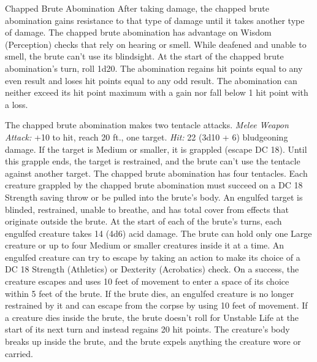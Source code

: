 \documentclass[10pt,a4paper,twoside,twocolumn,openany,bg=print,nodeprecatedcode]{dndbook}
\begin{document}
\begin{DndMonster}[float*=t]{Chapped Brute Abomination}
\DndMonsterBasics[
armor-class = {16 (natural armor)},
hit-points = {\DndDice{14d12 + 70}},
speed = {40 ft.}
]
\DndMonsterAbilityScores[
 str = 23,
 dex = 10,
 con = 20,
 int = 3,
 wis = 10,
 cha = 5
]
\DndMonsterDetails[
skills = {Athletics +10},
damage-resistances = {necrotic},
senses = {blindsight 90 ft. (blind beyond this radius), passive perception 10},
challenge = 9,
]
After taking damage, the chapped brute abomination gains resistance to that type of damage until it takes another type of damage.
The chapped brute abomination has advantage on Wisdom (Perception) checks that rely on hearing or smell. While deafened and unable to smell, the brute can't use its blindsight.
At the start of the chapped brute abomination's turn, roll 1d20. The abomination regains hit points equal to any even result and loses hit points equal to any odd result. The abomination can neither exceed its hit point maximum with a gain nor fall below 1 hit point with a loss.
\par
{}
The chapped brute abomination makes two tentacle attacks.
\textsl{Melee Weapon Attack:} +10 to hit, reach 20 ft., one target. \textsl{Hit:} 22 (3d10 + 6) bludgeoning damage. If the target is Medium or smaller, it is grappled (escape DC 18). Until this grapple ends, the target is restrained, and the brute can't use the tentacle against another target. The chapped brute abomination has four tentacles.
Each creature grappled by the chapped brute abomination must succeed on a DC 18 Strength saving throw or be pulled into the brute's body. An engulfed target is blinded, restrained, unable to breathe, and has total cover from effects that originate outside the brute. At the start of each of the brute's turns, each engulfed creature takes 14 (4d6) acid damage. The brute can hold only one Large creature or up to four Medium or smaller creatures inside it at a time.
An engulfed creature can try to escape by taking an action to make its choice of a DC 18 Strength (Athletics) or Dexterity (Acrobatics) check. On a success, the creature escapes and uses 10 feet of movement to enter a space of its choice within 5 feet of the brute.
If the brute dies, an engulfed creature is no longer restrained by it and can escape from the corpse by using 10 feet of movement.
If a creature dies inside the brute, the brute doesn't roll for Unstable Life at the start of its next turn and instead regains 20 hit points. The creature's body breaks up inside the brute, and the brute expels anything the creature wore or carried.
\end{DndMonster}
\end{document}
